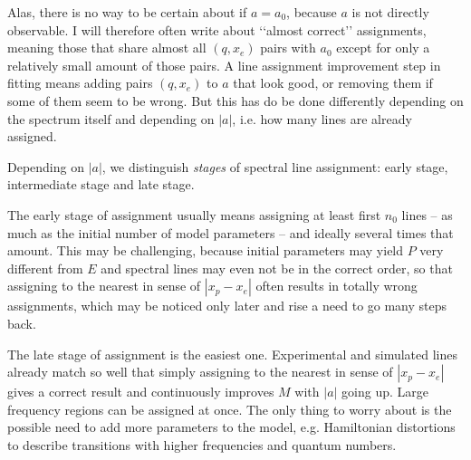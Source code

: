 \documentclass[11pt]{article}
\begin{document}
Alas, there is no way to be certain about if $a = a_0$, because $a$ is not directly observable. I will therefore often write about \lq\lq{}almost correct\rq\rq{} assignments, meaning those that share almost all $(q, x_e)$ pairs with $a_0$ except for only a relatively small amount of those pairs. %
A line assignment improvement step in fitting means adding pairs $(q, x_e)$ to $a$ that look good, or removing them if some of them seem to be wrong. But this has do be done differently depending on the spectrum itself and depending on $|a|$, i.e. how many lines are already assigned. 



Depending on $|a|$, we distinguish \emph{stages} of spectral line assignment: early stage, intermediate stage and late stage.

The early stage of assignment usually means assigning at least first $n_0$ lines -- as much as the initial number of model parameters -- and ideally several times that amount. This may be challenging, because initial parameters may yield $P$ very different from $E$ and spectral lines may even not be in the correct order, so that assigning to the nearest in sense of $|x_p - x_e|$ often results in totally wrong assignments, which may be noticed only later and rise a need to go many steps back. 

The late stage of assignment is the easiest one. Experimental and simulated lines already match so well that simply assigning to the nearest in sense of $|x_p - x_e|$ gives a correct result and continuously improves $M$ with $|a|$ going up. Large frequency regions can be assigned at once. The only thing to worry about is the possible need to add more parameters to the model, e.g. Hamiltonian distortions to describe transitions with higher frequencies and quantum numbers.  
\end{document}
